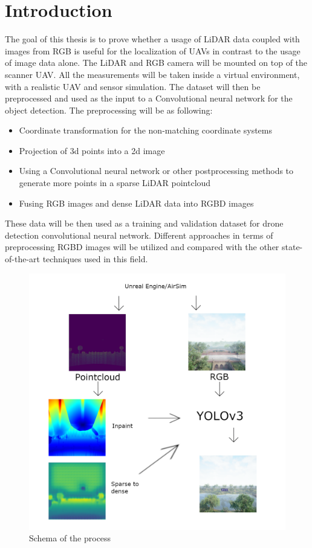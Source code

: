 \documentclass[twoside]{ctuthesis}
\theoremstyle{plain}
\theoremstyle{definition}
\theoremstyle{note}
\begin{document}
\maketitle
\chapter{Introduction}
The goal of this thesis is to prove whether a usage of LiDAR data coupled with images from RGB is useful for the localization of UAVs in contrast to the usage of image data alone. The LiDAR and RGB camera will be mounted on top of the scanner UAV. All the measurements will be taken inside a virtual environment, with a realistic UAV and sensor simulation. The dataset will then be preprocessed and used as the input to a Convolutional neural network for the object detection. The preprocessing will be as following:
\begin{itemize}
	\item Coordinate transformation for the non-matching coordinate systems
	\item Projection of 3d points into a 2d image
	\item Using a Convolutional neural network or other postprocessing methods to generate more points in a sparse LiDAR pointcloud
	\item Fusing RGB images and dense LiDAR data into RGBD images
\end{itemize}
These data will be then used as a training and validation dataset for drone detection convolutional neural network. Different approaches in terms of preprocessing RGBD images will be utilized and compared with the other state-of-the-art techniques used in this field.
\begin{figure}[h]
	\centering
	\includegraphics[width=\textwidth]{intro_schema.png}
	\caption{Schema of the process}
\end{figure}
\pagebreak
\end{document}
